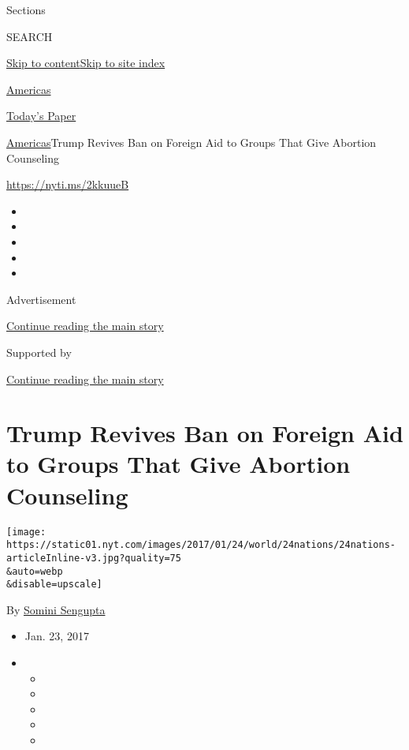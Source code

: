 Sections

SEARCH

\protect\hyperlink{site-content}{Skip to
content}\protect\hyperlink{site-index}{Skip to site index}

\href{https://www.nytimes.com/section/world/americas}{Americas}

\href{https://myaccount.nytimes.com/auth/login?response_type=cookie\&client_id=vi}{}

\href{https://www.nytimes.com/section/todayspaper}{Today's Paper}

\href{/section/world/americas}{Americas}\textbar{}Trump Revives Ban on
Foreign Aid to Groups That Give Abortion Counseling

\url{https://nyti.ms/2kkuueB}

\begin{itemize}
\item
\item
\item
\item
\item
\end{itemize}

Advertisement

\protect\hyperlink{after-top}{Continue reading the main story}

Supported by

\protect\hyperlink{after-sponsor}{Continue reading the main story}

\hypertarget{trump-revives-ban-on-foreign-aid-to-groups-that-give-abortion-counseling}{%
\section{Trump Revives Ban on Foreign Aid to Groups That Give Abortion
Counseling}\label{trump-revives-ban-on-foreign-aid-to-groups-that-give-abortion-counseling}}

\texttt{[image: https://static01.nyt.com/images/2017/01/24/world/24nations/24nations-articleInline-v3.jpg?quality=75\\\&auto=webp\\\&disable=upscale]}

By \href{http://www.nytimes.com/by/somini-sengupta}{Somini Sengupta}

\begin{itemize}
\item
  Jan. 23, 2017
\item
  \begin{itemize}
  \item
  \item
  \item
  \item
  \item
  \end{itemize}
\end{itemize}

